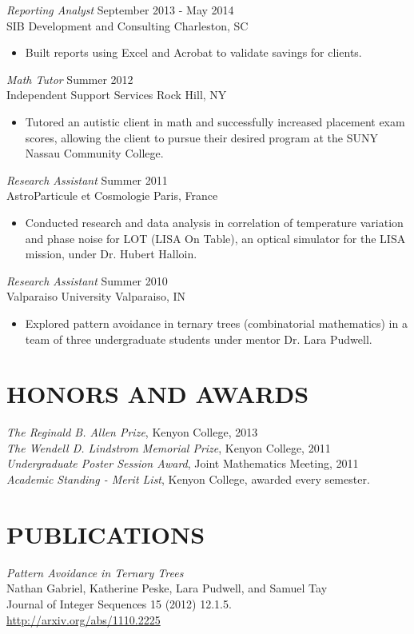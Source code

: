 \documentclass[margin]{res}
\begin{document}
\begin{resume}
  {\sl Reporting Analyst} \hfill            September 2013 - May 2014 \\
  SIB Development and Consulting \hfill Charleston, SC
  \begin{itemize}  \itemsep -2pt %
    \item Built reports using Excel and Acrobat to validate savings for clients.
  \end{itemize}

  {\sl Math Tutor} \hfill        Summer 2012 \\
  Independent Support Services \hfill Rock Hill, NY
  \begin{itemize}
    \item Tutored an autistic client in math and successfully increased placement exam
      scores, allowing the client to pursue their desired program at the SUNY Nassau
      Community College.
  \end{itemize}

  {\sl Research Assistant} \hfill        Summer 2011 \\
  AstroParticule et Cosmologie \hfill Paris, France
  \begin{itemize}
    \item Conducted research and data analysis in correlation of temperature variation and
      phase noise for LOT (LISA On Table), an optical simulator for the LISA mission,
      under Dr. Hubert Halloin.
  \end{itemize}

  {\sl Research Assistant} \hfill        Summer 2010 \\
  Valparaiso University \hfill Valparaiso, IN
  \begin{itemize}
    \item Explored pattern avoidance in ternary trees (combinatorial mathematics) in a
      team of three undergraduate students under mentor Dr. Lara Pudwell.
  \end{itemize}

\section{HONORS AND AWARDS}
  {\sl The Reginald B. Allen Prize}, Kenyon College, 2013 \\
  {\sl The Wendell D. Lindstrom Memorial Prize}, Kenyon College, 2011 \\
  {\sl Undergraduate Poster Session Award}, Joint Mathematics Meeting, 2011 \\
  {\sl Academic Standing - Merit List}, Kenyon College, awarded every semester.

\section{PUBLICATIONS}
  {\sl Pattern Avoidance in Ternary Trees} \\
  Nathan Gabriel, Katherine Peske, Lara Pudwell, and Samuel Tay \\
  Journal of Integer Sequences 15 (2012) 12.1.5. \\
  \url{http://arxiv.org/abs/1110.2225}

\end{resume}
\end{document}
